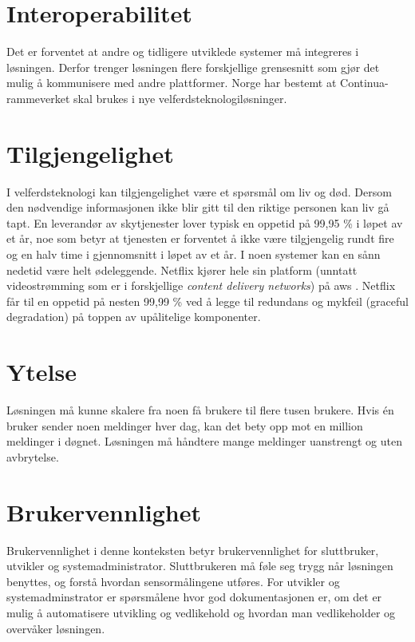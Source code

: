 \section{Interoperabilitet}
Det er forventet at andre og tidligere utviklede systemer må integreres i løsningen. Derfor trenger løsningen flere forskjellige
grensesnitt som gjør det mulig å kommunisere med andre plattformer.
Norge har bestemt at Continua-rammeverket skal brukes i nye
velferdsteknologiløsninger.

\section{Tilgjengelighet}
I velferdsteknologi kan tilgjengelighet være et spørsmål om liv og død. Dersom den nødvendige informasjonen ikke blir gitt til den
riktige personen kan liv gå tapt. En leverandør av skytjenester lover typisk en oppetid på 99,95 \% i løpet av et år,
noe som betyr at tjenesten er forventet å ikke være tilgjengelig rundt fire og en halv time
i gjennomsnitt i løpet av et år. I noen systemer kan en sånn nedetid være helt ødeleggende.
Netflix kjører hele sin platform (unntatt videostrømming som er i forskjellige
\textit{content delivery networks}) på \gls{aws} \citep{netflix_aws}. Netflix får til en oppetid
på nesten 99,99 \% ved å legge til redundans og mykfeil (graceful degradation) på toppen av
upålitelige komponenter.

\section{Ytelse}
Løsningen må kunne skalere fra noen få brukere til flere tusen brukere. Hvis én bruker sender noen meldinger hver dag, kan det
bety opp mot en million meldinger i døgnet. Løsningen må håndtere mange meldinger uanstrengt og uten avbrytelse.

\section{Brukervennlighet}
Brukervennlighet i denne konteksten betyr brukervennlighet for sluttbruker, utvikler og systemadministrator.
Sluttbrukeren må føle seg trygg når løsningen benyttes, og forstå hvordan sensormålingene utføres.
For utvikler og systemadminstrator er spørsmålene hvor god dokumentasjonen er, om det er mulig å automatisere
utvikling og vedlikehold og hvordan man vedlikeholder og overvåker løsningen.

